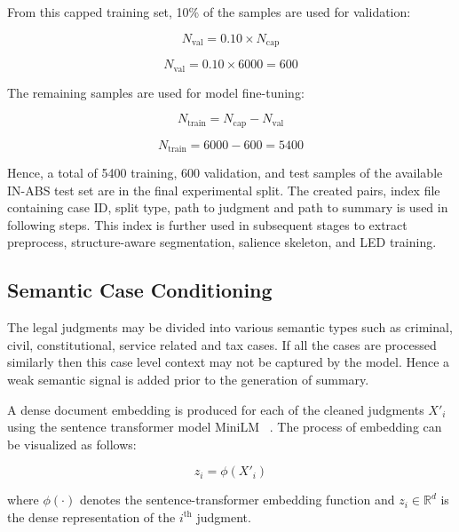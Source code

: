 \documentclass[11pt, a4paper]{article}
\theoremstyle{plain}%
\theoremstyle{remark}%
\theoremstyle{definition}%
\begin{document}
From this capped training set, 10\% of the samples are used for validation:

\begin{equation}
N_{\text{val}}=0.10 \times N_{\text{cap}}
\end{equation}

\begin{equation}
N_{\text{val}}=0.10 \times 6000=600
\end{equation}

The remaining samples are used for model fine-tuning:

\begin{equation}
N_{\text{train}}=N_{\text{cap}}-N_{\text{val}}
\end{equation}

\begin{equation}
N_{\text{train}}=6000-600=5400
\end{equation}

Hence, a total of 5400 training, 600 validation, and test samples of the available IN-ABS test set are in the final experimental split. The created pairs, index file containing case ID, split type, path to judgment and path to summary is used in following steps. This index is further used in subsequent stages to extract preprocess, structure-aware segmentation, salience skeleton, and LED training.

\subsection{Semantic Case Conditioning}

The legal judgments may be divided into various semantic types such as criminal, civil, constitutional, service related and tax cases. If all the cases are processed similarly then this case level context may not be captured by the model. Hence a weak semantic signal is added prior to the generation of summary.

A dense document embedding is produced for each of the cleaned judgments \(X'_i\) using the sentence transformer model MiniLM ~\cite{b41}. The process of embedding can be visualized as follows:

\begin{equation}
z_i=\phi(X'_i)
\end{equation}

where \(\phi(\cdot)\) denotes the sentence-transformer embedding function and \(z_i \in \mathbb{R}^{d}\) is the dense representation of the \(i^{\text{th}}\) judgment.
\end{document}
